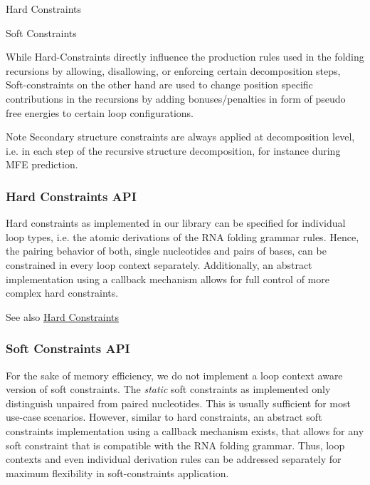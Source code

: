 \begin{DoxyItemize}
\item Hard Constraints
\item Soft Constraints
\end{DoxyItemize}

While Hard-\/\+Constraints directly influence the production rules used in the folding recursions by allowing, disallowing, or enforcing certain decomposition steps, Soft-\/constraints on the other hand are used to change position specific contributions in the recursions by adding bonuses/penalties in form of pseudo free energies to certain loop configurations.

\begin{DoxyNote}{Note}
Secondary structure constraints are always applied at decomposition level, i.\+e. in each step of the recursive structure decomposition, for instance during M\+FE prediction.
\end{DoxyNote}
\hypertarget{folding_grammar_sec_constraints_hard_api}{}\subsubsection{Hard Constraints A\+PI}\label{folding_grammar_sec_constraints_hard_api}
Hard constraints as implemented in our library can be specified for individual loop types, i.\+e. the atomic derivations of the R\+NA folding grammar rules. Hence, the pairing behavior of both, single nucleotides and pairs of bases, can be constrained in every loop context separately. Additionally, an abstract implementation using a callback mechanism allows for full control of more complex hard constraints.

\begin{DoxySeeAlso}{See also}
\hyperlink{group__hard__constraints}{Hard Constraints}
\end{DoxySeeAlso}
\hypertarget{folding_grammar_sec_constraints_soft_api}{}\subsubsection{Soft Constraints A\+PI}\label{folding_grammar_sec_constraints_soft_api}
For the sake of memory efficiency, we do not implement a loop context aware version of soft constraints. The {\itshape static} soft constraints as implemented only distinguish unpaired from paired nucleotides. This is usually sufficient for most use-\/case scenarios. However, similar to hard constraints, an abstract soft constraints implementation using a callback mechanism exists, that allows for any soft constraint that is compatible with the R\+NA folding grammar. Thus, loop contexts and even individual derivation rules can be addressed separately for maximum flexibility in soft-\/constraints application.

